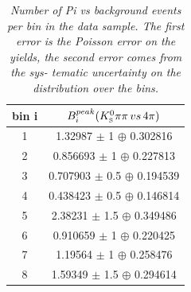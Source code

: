 \begin{table}[!h]
	\begin{center}
		\begin{tabular}{c| c}
			bin i & $B^{peak}_i({K^0_{\rm\scriptscriptstyle S}}{\pi}\pi\, vs\, 4\pi)$    \\
			\hline 
			\hline
1 & 1.32987 $\pm$ 1 $\oplus$ 0.302816 \\ 
2 & 0.856693 $\pm$ 1 $\oplus$ 0.227813 \\ 
3 & 0.707903 $\pm$ 0.5 $\oplus$ 0.194539 \\ 
4 & 0.438423 $\pm$ 0.5 $\oplus$ 0.146814 \\ 
5 & 2.38231 $\pm$ 1.5 $\oplus$ 0.349486 \\ 
6 & 0.910659 $\pm$ 1 $\oplus$ 0.220425 \\ 
7 & 1.19564 $\pm$ 1 $\oplus$ 0.258476 \\ 
8 & 1.59349 $\pm$ 1.5 $\oplus$ 0.294614 \\ 

	\end{tabular}
	\end{center}
	\caption{\textit{Number of \4Pi vs \KsPiPi background events per bin in the data sample. The first error is the Poisson error on the yields, the second error comes from the sys- tematic uncertainty on the distribution over the bins. }}
	\vspace*{1cm}
\end{table}

